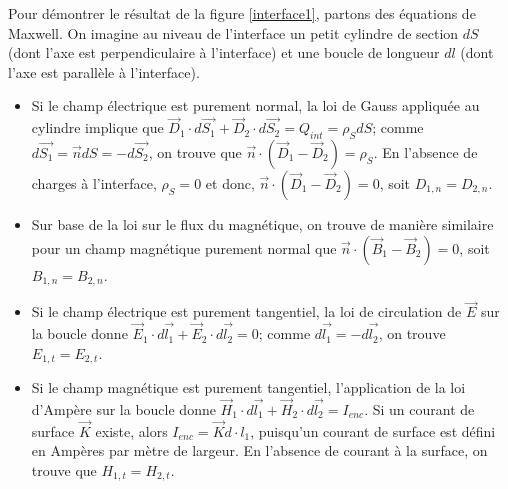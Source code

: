  
 Pour démontrer le résultat de la figure \ref{interface1}, partons des équations de Maxwell. On imagine au niveau de l'interface un petit cylindre de section $dS$ (dont l'axe est perpendiculaire à l'interface) et une boucle de longueur $dl$ (dont l'axe est parallèle à l'interface). 
\begin{itemize}
\item Si le champ électrique est purement normal, la loi de Gauss appliquée au cylindre  implique que $\vec{D}_{1}\cdot d\vec{S_1} +  \vec{D}_{2}\cdot d\vec{S_2} = Q_{int} = \rho_S dS$; comme $d\vec{S_1} = \vec{n}dS = -d\vec{S_2}$, on trouve que $\vec{n}\cdot(\vec{D}_{1} - \vec{D}_{2}) = \rho_S$. En l'absence de charges à l'interface, $\rho_S = 0$ et donc, $\vec{n}\cdot(\vec{D}_{1} - \vec{D}_{2}) = 0$, soit ${D}_{1,n} = {D}_{2,n}$.
\item Sur base de la loi sur le flux du magnétique, on trouve de manière similaire pour un champ magnétique purement normal que $\vec{n}\cdot(\vec{B}_{1} - \vec{B}_{2}) = 0$, soit ${B}_{1,n} = {B}_{2,n}$.
\item Si le champ électrique est purement tangentiel, la loi de circulation de $\vec{E}$ sur la boucle donne $\vec{E}_1\cdot d\vec{l_1} + \vec{E}_2\cdot d\vec{l_2} = 0$; comme $d\vec{l_1} = - d\vec{l_2}$, on trouve  ${E}_{1,t} =  {E}_{2,t}$.
\item Si le champ magnétique est purement tangentiel, l'application de la loi d'Ampère sur la boucle donne $\vec{H}_1\cdot d\vec{l_1} + \vec{H}_2\cdot d\vec{l_2} = I_{enc}$. Si un courant de surface $\vec{K}$ existe, alors $I_{enc} = \vec{K} d\cdot{l_1}$, puisqu'un courant de surface est défini en Ampères par mètre de largeur. En l'absence de courant à la surface, on trouve que ${H}_{1,t} =  {H}_{2,t}$.
\end{itemize} 
 
